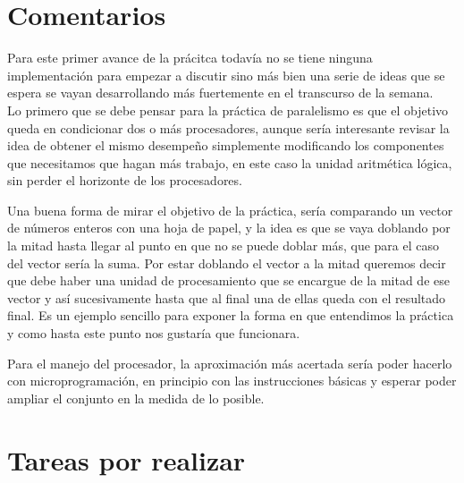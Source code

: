 \documentclass[%
	final,
	notitlepage,
	narroweqnarray,
	inline,
	twoside,
	]{ieee}
\begin{document}
\section{Comentarios}

\PARstart Para este primer avance de la prácitca todavía no se tiene ninguna implementación para empezar
a discutir sino más bien una serie de ideas que se espera se vayan desarrollando más fuertemente en el
transcurso de la semana.\\
Lo primero que se debe pensar para la práctica de paralelismo es que el objetivo queda en condicionar dos
o más procesadores, aunque sería interesante revisar la idea de obtener el mismo desempeño simplemente
modificando los componentes que necesitamos que hagan más trabajo, en este caso la unidad aritmética lógica,
sin perder el horizonte de los procesadores.

Una buena forma de mirar el objetivo de la práctica, sería comparando un vector de números enteros con una
hoja de papel, y la idea es que se vaya doblando por la mitad hasta llegar al punto en que no se puede doblar más,
que para el caso del vector sería la suma. Por estar doblando el vector a la mitad queremos decir que debe haber una
unidad de procesamiento que se encargue de la mitad de ese vector y así sucesivamente hasta que al final una de ellas
queda con el resultado final. Es un ejemplo sencillo para exponer la forma en que entendimos la práctica y
como hasta este punto nos gustaría que funcionara.
 
 Para el manejo del procesador, la aproximación más acertada sería poder hacerlo con microprogramación, en principio
 con las instrucciones básicas y esperar poder ampliar el conjunto en la medida de lo posible.





\section{Tareas por realizar}
\end{document}
